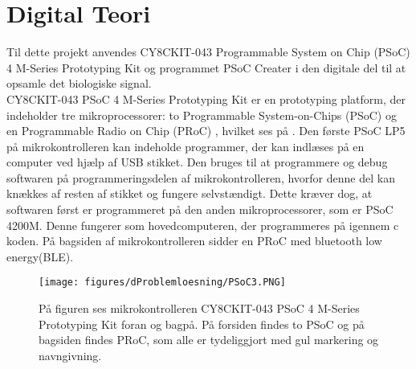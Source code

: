 \section{Digital Teori}
Til dette projekt anvendes CY8CKIT-043 Programmable System on Chip (PSoC) 4 M-Series Prototyping Kit og programmet PSoC Creater i den digitale del til at opsamle det biologiske signal.\\
CY8CKIT-043 PSoC 4 M-Series Prototyping Kit er en prototyping platform, der indeholder tre mikroprocessorer: to Programmable System-on-Chips (PSoC) og en Programmable Radio on Chip (PRoC)%
, hvilket ses på \figref. Den første PSoC LP5 på mikrokontrolleren kan indeholde programmer, der kan indlæses på en computer ved hjælp af USB stikket. Den bruges til at programmere og debug softwaren på programmeringsdelen af mikrokontrolleren, hvorfor denne del kan knækkes af resten af stikket og fungere selvstændigt. Dette kræver dog, at softwaren først er programmeret på den anden mikroprocessorer, som er PSoC 4200M. Denne fungerer som hovedcomputeren, der programmeres på igennem c koden. På bagsiden af mikrokontrolleren sidder en PRoC med bluetooth low energy(BLE). \citep{CYPRESS2016PSoC,Semiconductor2016}
\begin{figure}[H]
	\centering
	\texttt{[image: figures/dProblemloesning/PSoC3.PNG]}
	\caption{På figuren ses mikrokontrolleren CY8CKIT-043 PSoC 4 M-Series Prototyping Kit foran og bagpå. På forsiden findes to PSoC og på bagsiden findes PRoC, som alle er tydeliggjort med gul markering og navngivning.}
	\label{fig:PSoC}
\end{figure}

